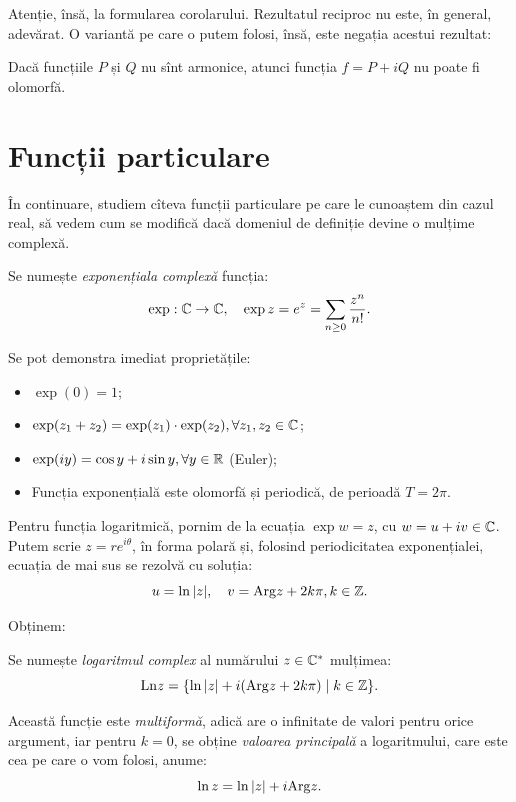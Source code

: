 Atenție, însă, la formularea corolarului. Rezultatul reciproc nu este,
în general, adevărat. O variantă pe care o putem folosi, însă, este negația
acestui rezultat:

\begin{corollary}\label{cor:olo-arm-neg}
  Dacă funcțiile $ P $ și $ Q $ nu sînt armonice, atunci funcția $ f = P + iQ $ nu
  poate fi olomorfă.
\end{corollary}


\section{Funcții particulare}

\indent\indent În continuare, studiem cîteva funcții particulare pe care le
cunoaștem din cazul real, să vedem cum se modifică dacă domeniul de definiție
devine o mulțime complexă.

\begin{definition}\label{def:exp}
  Se numește \emph{exponențiala complexă} funcția:
  \[
    \exp : \mathbb{C} \to \mathbb{C}, \quad \exp z = e^z = \sum_{n \geq 0} \dfrac{z^n}{n!}.
  \]
\end{definition}

Se pot demonstra imediat proprietățile:
\begin{itemize}
\item $ \exp(0) = 1 $;
\item $ \exp(z_1 + z_2) = \exp(z_1) \cdot \exp(z_2), \forall z_1, z_2 \in \mathbb{C} $;
\item $ \exp(iy) = \cos y + i \sin y, \forall y \in \mathbb{R} $ (Euler);
\item Funcția exponențială este olomorfă și periodică, de perioadă $ T = 2\pi $.
\end{itemize}

Pentru funcția logaritmică, pornim de la ecuația $ \exp w = z $, cu $ w = u + iv \in \mathbb{C} $.
Putem scrie $ z = re^{i\theta} $, în forma polară și, folosind periodicitatea exponențialei,
ecuația de mai sus se rezolvă cu soluția:
\[
  u = \ln |z|, \quad v = \mathrm{Arg}z + 2 k \pi, k \in \mathbb{Z}.
\]

Obținem:

\begin{definition}\label{def:log}
  Se numește \emph{logaritmul complex} al numărului $ z \in \mathbb{C}^\ast $ mulțimea:
  \[
    \mathrm{Ln}z = \{ \ln|z| + i(\mathrm{Arg}z + 2 k \pi) \mid k \in \mathbb{Z} \}.
  \]

  Această funcție este \emph{multiformă}, adică are o infinitate de valori pentru
  orice argument, iar pentru $ k = 0 $, se obține \emph{valoarea principală} a
  logaritmului, care este cea pe care o vom folosi, anume:
  \[
    \ln z = \ln |z| + i \mathrm{Arg} z.
  \]
\end{definition}

